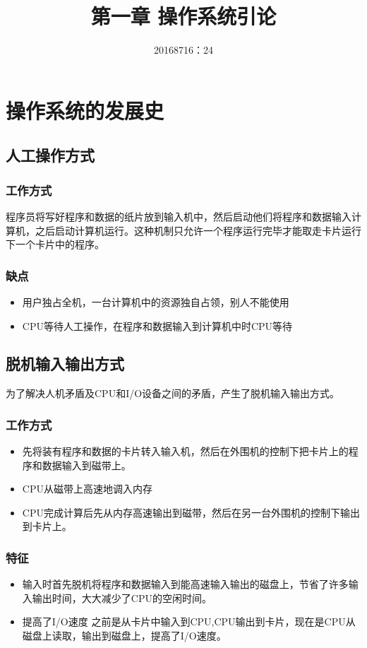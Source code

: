 \documentclass[]{scrartcl}
\title{第一章 操作系统引论}
\author{20168716\quad彭文\quad物联网\quad班级序列号：24}
\begin{document}
\maketitle

\section{操作系统的发展史}
	\subsection{人工操作方式}
		\quad
		\subsubsection{工作方式}
		程序员将写好程序和数据的纸片放到输入机中，然后启动他们将程序和数据输入计算机，之后启动计算机运行。这种机制只允许一个程序运行完毕才能取走卡片运行下一个卡片中的程序。
		 
		\subsubsection{缺点}
		\begin{itemize}
			\item 用户独占全机，一台计算机中的资源独自占领，别人不能使用
			\item  CPU等待人工操作，在程序和数据输入到计算机中时CPU等待
		\end{itemize}
	\subsection{脱机输入输出方式}
		\quad
		
		为了解决人机矛盾及CPU和I/O设备之间的矛盾，产生了脱机输入输出方式。
		
		\subsubsection{工作方式}
		\quad
			\begin{itemize}
				\item 先将装有程序和数据的卡片转入输入机，然后在外围机的控制下把卡片上的程序和数据输入到磁带上。
				\item CPU从磁带上高速地调入内存
				\item CPU完成计算后先从内存高速输出到磁带，然后在另一台外围机的控制下输出到卡片上。
			\end{itemize}
		\subsubsection{特征}
			\begin{itemize}
				\item 输入时首先脱机将程序和数据输入到能高速输入输出的磁盘上，节省了许多输入输出时间，大大减少了CPU的空闲时间。
				\item 提高了I/O速度 之前是从卡片中输入到CPU,CPU输出到卡片，现在是CPU从磁盘上读取，输出到磁盘上，提高了I/O速度。
			\end{itemize}
\end{document}
